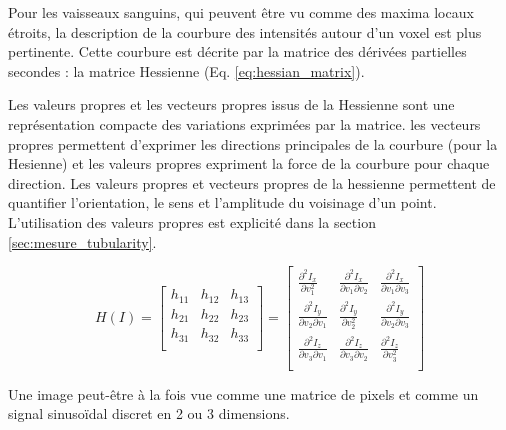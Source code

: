Pour les vaisseaux sanguins, qui peuvent être vu comme des maxima locaux étroits, la description de la courbure des intensités autour d'un voxel est plus pertinente. Cette courbure est décrite par la matrice des dérivées partielles secondes : la matrice Hessienne (Eq. \ref{eq:hessian_matrix}). 

Les valeurs propres et les vecteurs propres issus de la Hessienne sont une représentation compacte des variations exprimées par la matrice. les vecteurs propres permettent d'exprimer les directions principales de la courbure (pour la Hesienne) et les valeurs propres expriment la force de la courbure pour chaque direction.
Les valeurs propres et vecteurs propres de la hessienne permettent de quantifier l'orientation, le sens et l'amplitude du voisinage d'un point. L'utilisation des valeurs propres est explicité dans la section \ref{sec:mesure_tubularity}.

\begin{equation}
  H(I) =
  \begin{bmatrix}
  h_{11} & h_{12} & h_{13} \\
  h_{21} & h_{22} & h_{23} \\
  h_{31} & h_{32} & h_{33} \\
  \end{bmatrix}
    =
  \begin{bmatrix}
  \frac{\partial^2 I_x}{\partial v^2_1} & \frac{\partial^2 I_x}{\partial v_1 \partial v_2} & \frac{\partial^2 I_x}{\partial v_1 \partial v_3} \\
  \frac{\partial^2 I_y}{\partial v_2 \partial v_1} & \frac{\partial^2 I_y}{\partial v^2_2} & \frac{\partial^2 I_y}{\partial v_2 \partial v_3} \\
  \frac{\partial^2 I_z}{\partial v_3 \partial v_1} & \frac{\partial^2 I_z}{\partial v_3 \partial v_2} & \frac{\partial^2 I_z}{\partial v^2_3} \\
  \end{bmatrix}
  \label{eq:hessian_matrix}
\end{equation}


\label{sec:EA:rehaussement:Phase}

Une image peut-être à la fois vue comme une matrice de pixels et comme un signal sinusoïdal discret en 2 ou 3 dimensions. 

